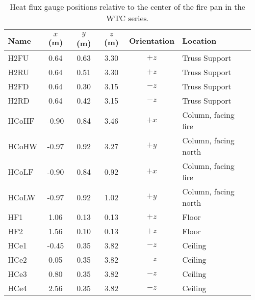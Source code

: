 \begin{table}[h!]
\caption{Heat flux gauge positions relative to the center of the fire pan in the WTC series.}
\begin{center}
\begin{tabular}{|l|c|c|c|c|l|}
\hline
Name    & $x$ (m)   & $y$ (m) & $z$ (m)   & Orientation  & Location  \\ \hline \hline
H2FU    & 0.64      & 0.63    & 3.30      &     $+z$     & Truss Support         \\ \hline
H2RU    & 0.64      & 0.51    & 3.30      &     $+z$     & Truss Support          \\ \hline
H2FD    & 0.64      & 0.30    & 3.15      &     $-z$     & Truss Support          \\ \hline
H2RD    & 0.64      & 0.42    & 3.15      &     $-z$     & Truss Support          \\ \hline
HCoHF   & -0.90     & 0.84    & 3.46      &     $+x$     & Column, facing fire          \\ \hline
HCoHW   & -0.97     & 0.92    & 3.27      &     $+y$     & Column, facing north          \\ \hline
HCoLF   & -0.90     & 0.84    & 0.92      &     $+x$     & Column, facing fire          \\ \hline
HCoLW   & -0.97     & 0.92    & 1.02      &     $+y$     & Column, facing north          \\ \hline
HF1     & 1.06      & 0.13    & 0.13      &     $+z$     & Floor          \\ \hline
HF2     & 1.56      & 0.10    & 0.13      &     $+z$     & Floor          \\ \hline
HCe1    & -0.45     & 0.35    & 3.82      &     $-z$     & Ceiling          \\ \hline
HCe2    &  0.05     & 0.35    & 3.82      &     $-z$     & Ceiling          \\ \hline
HCe3    &  0.80     & 0.35    & 3.82      &     $-z$     & Ceiling          \\ \hline
HCe4    &  2.56     & 0.35    & 3.82      &     $-z$     & Ceiling          \\ \hline
\end{tabular}
\end{center}
\label{WTC_Gauges}
\end{table}

\newpage

